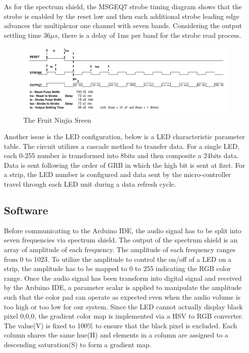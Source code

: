 \documentclass[12pt,a4paper,journal]{IEEEtran}
\begin{document}
As for the spectrum shield, the MSGEQ7 strobe timing diagram shows that the strobe is enabled by the reset low and then each additional strobe leading edge advances the multiplexor one channel with seven bands. Considering the output settling time $36\mu s$, there is a delay of 1ms per band for the strobe read process.

\begin{figure}[ht]
  \centering
  \includegraphics[width=0.7\linewidth]{timing1.png}
  \caption{The Fruit Ninjia Sreen}
  \label{fig:fruit}
\end{figure}

Another issue is the LED configuration, below is a LED characteristic parameter table. The circuit utilizes a cascade method to transfer data. For a single LED, each 0-255 number is transformed into 8bits and then composite a 24bits data. Data is sent following the order of GRB in which the high bit is sent at first. For a strip, the LED number is configured and data sent by the micro-controller travel through each LED unit during a data refresh cycle.\subsection{Software}
Before communicating to the Arduino IDE, the audio signal has to be split into seven frequencies via spectrum shield. The output of the spectrum shield is an array of amplitude of each frequency. The amplitude of each frequency ranges from 0 to 1023. To utilize the amplitude to control the on/off of a LED on a strip, the amplitude has to be mapped to 0 to 255 indicating the RGB color range. Once the audio signal has been transform into digital signal and received by the Arduino IDE, a parameter scalar is applied to manipulate the amplitude such that the color pad can operate as expected even when the audio volume is too high or too low for our system. Since the LED cannot actually display black pixel {0,0,0}, the gradient color map is implemented via a HSV to RGB converter. The value(V) is fixed to 100\% to ensure that the black pixel is excluded. Each column shares the same hue(H) and elements in a column are assigned to a descending saturation(S) to form a gradient map.
\end{document}
